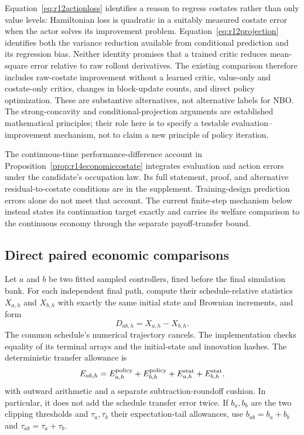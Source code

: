 Equation~\eqref{eq:r12actionloss} identifies a reason to regress costates rather than only value levels: Hamiltonian loss is quadratic in a suitably measured costate error when the actor solves its improvement problem. Equation~\eqref{eq:r12projection} identifies both the variance reduction available from conditional prediction and its regression bias. Neither identity promises that a trained critic reduces mean-square error relative to raw rollout derivatives. The existing comparison therefore includes raw-costate improvement without a learned critic, value-only and costate-only critics, changes in block-update counts, and direct policy optimization. These are substantive alternatives, not alternative labels for NBO. The strong-concavity and conditional-projection arguments are established mathematical principles; their role here is to specify a testable evaluation--improvement mechanism, not to claim a new principle of policy iteration.

The continuous-time performance-difference account in
Proposition~\ref{prop:r14economiccostate} integrates evaluation and action errors
under the candidate's occupation law. Its full statement, proof, and alternative
residual-to-costate conditions are in the supplement. Training-design prediction
errors alone do not meet that account. The current finite-step mechanism below
instead states its continuation target exactly and carries its welfare comparison
to the continuous economy through the separate payoff-transfer bound.

\subsection{Direct paired economic comparisons}
Let $a$ and $b$ be two fitted sampled controllers, fixed before the final simulation bank. For each independent final path, compute their schedule-relative statistics $X_{a,h}$ and $X_{b,h}$ with exactly the same initial state and Brownian increments, and form
\[
 D_{ab,h}=X_{a,h}-X_{b,h}.
\]
The common schedule's numerical trajectory cancels. The implementation checks equality of its terminal arrays and the initial-state and innovation hashes. The deterministic transfer allowance is
\[
 E_{ab,h}=E_{a,h}^{\rm policy}+E_{b,h}^{\rm policy}
              +E_{a,h}^{\rm stat}+E_{b,h}^{\rm stat},
\]
with outward arithmetic and a separate subtraction-roundoff cushion. In particular, it does not add the schedule transfer error twice. If $b_a,b_b$ are the two clipping thresholds and $\tau_a,\tau_b$ their expectation-tail allowances, use $b_{ab}=b_a+b_b$ and $\tau_{ab}=\tau_a+\tau_b$.

